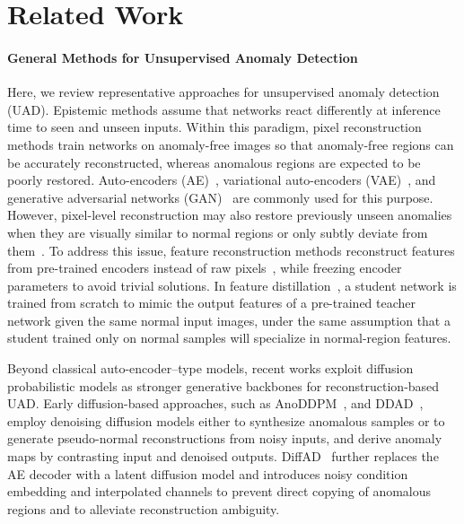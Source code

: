 \documentclass{article}
\theoremstyle{plain}
\theoremstyle{definition}
\theoremstyle{remark}
\begin{document}
\section{Related Work}
\label{sec:rw}

\paragraph{General Methods for Unsupervised Anomaly Detection} Here, we review representative approaches for unsupervised anomaly detection (UAD). Epistemic methods assume that networks react differently at inference time to seen and unseen inputs. Within this paradigm, pixel reconstruction methods train networks on anomaly-free images so that anomaly-free regions can be accurately reconstructed, whereas anomalous regions are expected to be poorly restored. Auto-encoders (AE)~\cite{zavrtanik2021reconstruction,hou2021divide}, variational auto-encoders (VAE)~\cite{liu2020towards,lu2023hierarchical}, and generative adversarial networks (GAN)~\cite{akcay2018ganomaly,yan2021learning} are commonly used for this purpose. However, pixel-level reconstruction may also restore previously unseen anomalies when they are visually similar to normal regions or only subtly deviate from them~\cite{deng2022anomaly}. To address this issue, feature reconstruction methods reconstruct features from pre-trained encoders instead of raw pixels~\cite{deng2022anomaly,yang2020dfr,you2022unified}, while freezing encoder parameters to avoid trivial solutions. In feature distillation~\cite{bergmann2020uninformed,salehi2021multiresolution}, a student network is trained from scratch to mimic the output features of a pre-trained teacher network given the same normal input images, under the same assumption that a student trained only on normal samples will specialize in normal-region features.

Beyond classical auto-encoder–type models, recent works exploit diffusion probabilistic models as stronger generative backbones for reconstruction-based UAD. Early diffusion-based approaches, such as AnoDDPM~\cite{wyatt2022anoddpm}, and DDAD~\cite{mousakhan2024anomaly}, employ denoising diffusion models either to synthesize anomalous samples or to generate pseudo-normal reconstructions from noisy inputs, and derive anomaly maps by contrasting input and denoised outputs. DiffAD~\cite{zhang2023unsupervised} further replaces the AE decoder with a latent diffusion model and introduces noisy condition embedding and interpolated channels to prevent direct copying of anomalous regions and to alleviate reconstruction ambiguity.
\end{document}
